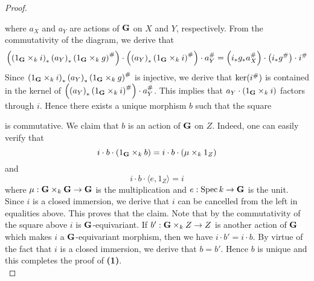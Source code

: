 \begin{proof}
\begin{center}
\begin{tikzpicture}
\end{tikzpicture}
\end{center}
where $a_X$ and $a_Y$ are actions of $\bd{G}$ on $X$ and $Y$, respectively. From the commutativity of the diagram, we derive that
$$\left(\left(1_{\bd{G}}\times_ki\right)_*\left(a_Y\right)_*\left(1_{\bd{G}}\times_kg\right)^{\#}\right)\cdot \left(\left(a_Y\right)_*\left(1_{\bd{G}}\times_ki\right)^{\#} \right)\cdot a_Y^{\#} = \left(i_*g_*a_X^{\#}\right)\cdot \left(i_*g^{\#} \right) \cdot i^{\#}$$
Since $\left(1_{\bd{G}}\times_ki\right)_*\left(a_Y\right)_*\left(1_{\bd{G}}\times_kg\right)^{\#}$ is injective, we derive that $\Ker(i^{\#})$ is contained in the kernel of $\left(\left(a_Y\right)_*\left(1_{\bd{G}}\times_ki\right)^{\#} \right)\cdot a_Y^{\#}$. This implies that $a_Y\cdot \left(1_{\bd{G}}\times_ki\right)$ factors through $i$. Hence there exists a unique morphism $b$ such that the square
\begin{center}
\end{center}
is commutative. We claim that $b$ is an action of $\bd{G}$ on $Z$. Indeed, one can easily verify that
$$i\cdot b\cdot \left(1_{\bd{G}}\times_k b\right) = i\cdot b \cdot \left(\mu \times_k 1_Z\right)$$
and
$$i \cdot b \cdot \langle e, 1_Z \rangle = i$$
where $\mu:\bd{G}\times_k\bd{G}\ra \bd{G}$ is the multiplication and $e:\Spec k\ra \bd{G}$ is the unit. Since $i$ is a closed immersion, we derive that $i$ can be cancelled from the left in equalities above. This proves that the claim. Note that by the commutativity of the square above $i$ is $\bd{G}$-equivariant. If $b':\bd{G}\times_kZ\ra Z$ is another action of $\bd{G}$ which makes $i$ a $\bd{G}$-equivariant morphism, then we have $i\cdot b' = i\cdot b$. By virtue of the fact that $i$ is a closed immersion, we derive that $b = b'$. Hence $b$ is unique and this completes the proof of \textbf{(1)}.\\

\end{proof}
